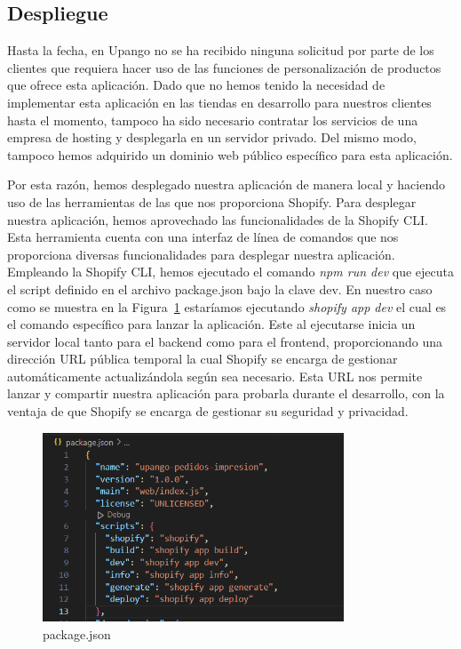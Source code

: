 \documentclass[12pt]{article}
\begin{document}
\subsection{Despliegue}
Hasta la fecha, en Upango no se ha recibido ninguna solicitud por parte de los clientes que requiera hacer uso de las funciones de personalización de productos
que ofrece esta aplicación. Dado que no hemos tenido la necesidad de implementar esta aplicación en las tiendas en desarrollo para nuestros clientes hasta el momento, tampoco ha sido 
necesario contratar los servicios de una empresa de hosting y desplegarla en un servidor privado. Del mismo modo, tampoco hemos adquirido un dominio web público 
específico para esta aplicación.

Por esta razón, hemos desplegado nuestra aplicación de manera local y haciendo uso de las herramientas de las que nos proporciona Shopify. Para desplegar nuestra aplicación,
hemos aprovechado las funcionalidades de la Shopify CLI. Esta herramienta cuenta con una interfaz de línea de comandos que nos proporciona diversas funcionalidades para desplegar nuestra aplicación.
Empleando la Shopify CLI, hemos ejecutado el comando \textit{npm run dev} que ejecuta el script definido en el archivo package.json bajo la clave dev. En nuestro caso como se muestra en la Figura~\ref{fig:scriptsPackageJson} estaríamos ejecutando \textit{shopify app dev} el cual es el comando específico para lanzar la aplicación.
Este al ejecutarse inicia un servidor local tanto para el backend como para el frontend, proporcionando
una dirección URL pública temporal la cual Shopify se encarga de gestionar automáticamente actualizándola según sea necesario. Esta URL nos permite lanzar y compartir nuestra aplicación para probarla durante el desarrollo, con la ventaja de que 
Shopify se encarga de gestionar su seguridad y privacidad.

\begin{figure}[ht]
    \centering
    \includegraphics[width=0.8\textwidth]{imagenes/package.json.scripts.png}
    \caption{\label{fig:scriptsPackageJson}package.json}
    \vspace{\fill}
\end{figure}
\end{document}
